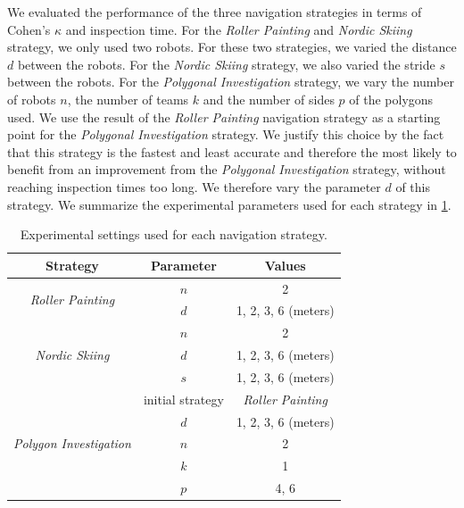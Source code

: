 We evaluated the performance of the three navigation strategies in terms of Cohen's $\kappa$ and inspection time.
For the \textit{Roller Painting} and \textit{Nordic Skiing} strategy, we only used two robots.
For these two strategies, we varied the distance $d$ between the robots.
For the \textit{Nordic Skiing} strategy, we also varied the stride $s$ between the robots.
For the \textit{Polygonal Investigation} strategy, we vary the number of robots $n$, the number of teams $k$ and the number of sides $p$ of the polygons used.
We use the result of the \textit{Roller Painting} navigation strategy as a starting point for the \textit{Polygonal Investigation} strategy.
We justify this choice by the fact that this strategy is the fastest and least accurate and therefore the most likely to benefit from an improvement from the \textit{Polygonal Investigation} strategy, without reaching inspection times too long.
We therefore vary the parameter $d$ of this strategy.
We summarize the experimental parameters used for each strategy in \ref{tab:exp_params}.

\begin{table}[h!]
	\centering
	\begin{tabular}{|c|c|c|}
		\hline
		Strategy & Parameter & Values \\
		\hline
		\multirow{2}{*}{\textit{Roller Painting}} & $n$ & 2 \\
		& $d$ & 1, 2, 3, 6 (meters) \\
		\hline
		\multirow{3}{*}{\textit{Nordic Skiing}} & $n$ & 2 \\
		& $d$ & 1, 2, 3, 6 (meters) \\
		& $s$ & 1, 2, 3, 6 (meters) \\
		\hline
		\multirow{5}{*}{\textit{Polygon Investigation}} & initial strategy & \textit{Roller Painting} \\
		& $d$ & 1, 2, 3, 6 (meters) \\
		& $n$ & 2 \\
		& $k$ & 1 \\
		& $p$ & 4, 6 \\
		\hline
	\end{tabular}
	\caption{Experimental settings used for each navigation strategy.}
	\label{tab:exp_params}
\end{table}

